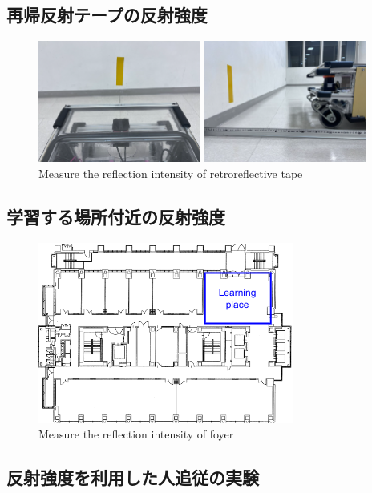 \subsection{再帰反射テープの反射強度}
  \begin{figure}[h]
    \centering
    \begin{minipage}[c]{65mm} 
        \centering
        \includegraphics[height=40mm]{images/RobotGuidance_exp2_tape_from_back.png}
    \end{minipage}
    \begin{minipage}[c]{65mm} 
        \centering
        \includegraphics[height=40mm]{images/RobotGuidance_exp2_tape_from_side.png}
    \end{minipage}
    \caption{Measure the reflection intensity of retroreflective tape}
    \label{Fig:RobotGuidance_exp2_tape}
  \end{figure}

\newpage

\subsection{学習する場所付近の反射強度}
  \begin{figure}[h]
    \centering
    \includegraphics[keepaspectratio, scale=0.80] {images/RobotGuidance_exp3_foyer.png}
    \captionsetup{justification=raggedright} %
    \caption{Measure the reflection intensity of foyer}
    \label{Fig:RobotGuidance_exp3_foyer}
  \end{figure}

\newpage

\subsection{反射強度を利用した人追従の実験}

\newpage
